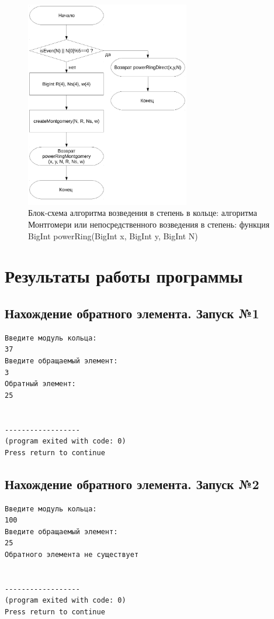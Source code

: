 \documentclass[a4paper,12pt]{article} %
\begin{document}
\begin{figure}[ht]
	\centering
	\includegraphics[width=0.64\textwidth]{lr5_powerRing.pdf}
	\caption{
		Блок-схема алгоритма возведения в степень в кольце: алгоритма Монтгомери или непосредственного возведения в степень:
		функция BigInt powerRing(BigInt x, BigInt y, BigInt N)
	}
	\label{bs_lr5_powerRing}
\end{figure}

\clearpage

\section*{Результаты работы программы}

\subsection*{Нахождение обратного элемента. Запуск №1}
\begin{verbatim}
Введите модуль кольца:
37
Введите обращаемый элемент:
3
Обратный элемент:
25


------------------
(program exited with code: 0)
Press return to continue
\end{verbatim}

\subsection*{Нахождение обратного элемента. Запуск №2}
\begin{verbatim}
Введите модуль кольца:
100
Введите обращаемый элемент:
25
Обратного элемента не существует


------------------
(program exited with code: 0)
Press return to continue
\end{verbatim}
\end{document}
